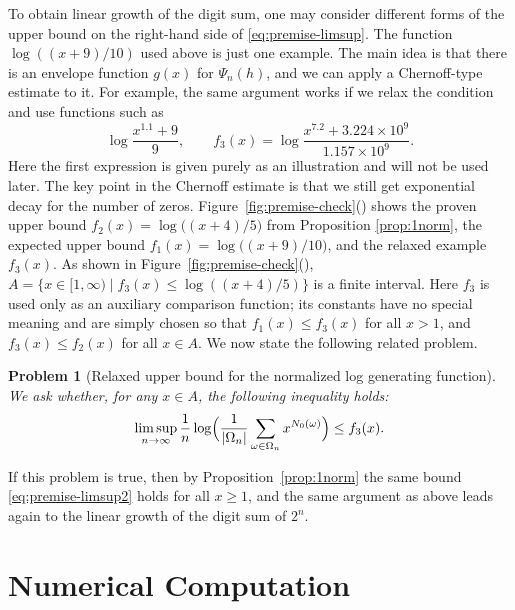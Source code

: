 \documentclass[11pt,a4paper]{article}
\newtheorem{problem}{Problem}
\theoremstyle{plain}
\begin{document}
To obtain linear growth of the digit sum, one may consider different forms of the upper bound on the right-hand side of \eqref{eq:premise-limsup}.
The function $\log((x+9)/10)$ used above is just one example.
The main idea is that there is an envelope function $g(x)$ for $\Psi_n(h)$,
and we can apply a Chernoff-type estimate to it.
For example, the same argument works if we relax the condition and use functions such as
\[
\log\frac{x^{1.1}+9}{9}, \qquad f_3(x)=\log\frac{x^{7.2}+3.224\times10^{9}}{1.157\times10^{9}}.
\]
Here the first expression is given purely as an illustration and will not be used later.
The key point in the Chernoff estimate is that we still get
exponential decay for the number of zeros.
Figure~\ref{fig:premise-check}()
 shows the proven upper bound $f_2(x)=\log\bigl((x+4)/5\bigr)$ from Proposition \ref{prop:1norm},
the expected upper bound $f_1(x)=\log\bigl((x+9)/10\bigr)$, and the relaxed example $f_3(x)$.
As shown in Figure~\ref{fig:premise-check}(), $A=\{x\in[1,\infty)\mid f_3(x)\le \log((x+4)/5)\}$ is a finite interval.
Here $f_3$ is used only as an auxiliary comparison function;
its constants have no special meaning and are simply chosen so that
$f_1(x)\le f_3(x)$ for all $x>1$, and $f_3(x)\le f_2(x)$ for all $x\in A$.
We now state the following related problem.


\begin{problem}[Relaxed upper bound for the normalized log generating function]\label{prob:limit_interval}
We ask whether, for any $x \in A$, the following inequality holds:
\begin{equation}\label{eq:premise-limsup2}
\limsup_{n\to\infty}\frac{1}{n}\log\Bigl(\frac{1}{|\Omega_n|}
\sum_{\omega\in\Omega_n} x^{N_0(\omega)} \Bigr)
\le f_3(x).
\end{equation}
\end{problem}


If this problem is true, then by Proposition~\ref{prop:1norm} the same bound \eqref{eq:premise-limsup2}  
holds for all $x\ge1$, and the same argument as above  
leads again to the linear growth of the digit sum of $2^n$.


\section{Numerical Computation}
\end{document}
